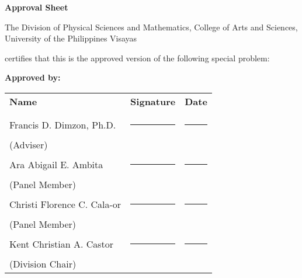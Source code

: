 \begin{center}
\textbf{Approval Sheet}

The Division of Physical Sciences and Mathematics, College of Arts and Sciences, University of the Philippines Visayas 

certifies that this is the approved version of the following special problem:

\end{center}

{\small\textbf{Approved by:}}

\newcommand{\signaturerule}{\rule{10em}{.4pt}}
	\begin{tabular}{lll}
		\bfseries Name  & \bfseries Signature & \bfseries Date\\ \\
		Francis D. Dimzon, Ph.D. &\signaturerule  & \signaturerule\\ 
		\multicolumn{1}{l}{(Adviser)} \\ 
		Ara Abigail E. Ambita &\signaturerule &\signaturerule\\
		\multicolumn{1}{l}{(Panel Member)}  \\
		Christi Florence C. Cala-or &\signaturerule &\signaturerule\\
		\multicolumn{1}{l}{(Panel Member)}\\
		Kent Christian A. Castor &\signaturerule &\signaturerule\\
		\multicolumn{1}{l}{(Division Chair)}

	\end{tabular}
